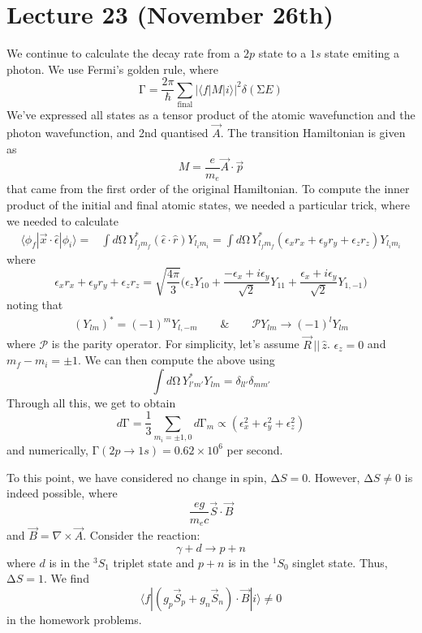 \section{Lecture 23 (November 26th)}
\begin{thm}
We continue to calculate the decay rate from a $2p$ state to a $1s$ state emiting a photon. We use Fermi's golden rule, where
\[\mathrm{\Gamma} =\dfrac{2\pi }{\hbar }\sum_{\mathrm{final}} |\langle f|M|i\rangle |^2\delta (\mathrm{\Sigma} E)\]
We've expressed all states as a tensor product of the atomic wavefunction and the photon wavefunction, and 2nd quantised $\vec{A}$. The transition Hamiltonian is given as
\[M=\dfrac{e}{m_{e}}\vec{A}\cdot \vec{p}\]
that came from the first order of the original Hamiltonian. To compute the inner product of the initial and final atomic states, we needed a particular trick, where we needed to calculate
\[\begin{align*}
\langle \phi _{f}|\vec{x}\cdot \hat{\epsilon }|\phi _{i}\rangle =&\int d\mathrm{\Omega} \,Y^{*}_{l_{f}m_{f}}(\hat{\epsilon }\cdot \hat{r})Y_{l_{i}m_{i}}=\int d\mathrm{\Omega} \,Y^{*}_{l_{f}m_{f}}(\epsilon_{x}r_{x}+\epsilon _{y}r_{y}+\epsilon _{z}r_{z})Y_{l_{i}m_{i}}
\end{align*}\]
where
\[\epsilon_{x}r_{x}+\epsilon_{y}r_{y}+\epsilon _{z}r_{z}=\sqrt{\dfrac{4\pi }{3}}\Big(\epsilon_{z}Y_{10}+\dfrac{-\epsilon_{x}+i\epsilon_{y}}{\sqrt{2}}Y_{11}+\dfrac{\epsilon _{x}+i\epsilon _{y}}{\sqrt{2}}Y_{1,-1}\Big)\]
noting that
\[\begin{align*}
(Y_{lm})^{*}=(-1)^{m}Y_{l,-m}\qquad\&\qquad \mathcal{P}Y_{lm}\rightarrow (-1)^{l}Y_{lm}
\end{align*}\]
where $\mathcal{P}$ is the parity operator. For simplicity, let's assume $\vec{R}\,||\,\hat{z}$. $\epsilon _{z}=0$ and $m_{f}-m_{i}=\pm 1$. We can then compute the above using
\[\int d\mathrm{\Omega} \,Y^{*}_{l'm'}Y_{lm}=\delta _{ll'}\delta _{mm'}\]
Through all this, we get to obtain
\[d\mathrm{\Gamma} =\dfrac{1}{3}\sum _{m_{i}=\pm 1,0}d\mathrm{\Gamma} _{m} \propto (\epsilon_{x}^2+\epsilon _{y}^2+\epsilon_{z}^2)\]
and numerically, $\mathrm{\Gamma} (2p\rightarrow 1s)=0.62\times 10^{6}$ per second. 
\end{thm}
\vspace{2ex}
\begin{ex}
To this point, we have considered no change in spin, $\mathrm{\Delta }S=0$. However, $\mathrm{\Delta }S\ne 0$ is indeed possible, where 
\[\dfrac{eg}{m_{e}c}\vec{S}\cdot \vec{B}\]
and $\vec{B}=\nabla \times \vec{A}$. Consider the reaction:
\[\gamma +d\rightarrow p+n\]
where $d$ is in the ${}^{3}S_{1}$ triplet state and $p+n$ is in the ${}^{1}S_{0}$ singlet state. Thus, $\mathrm{\Delta }S=1$. We find
\[\langle f|(g_{p}\vec{S}_{p}+g_{n}\vec{S}_{n})\cdot \vec{B}|i\rangle \ne 0\]
in the homework problems.
\end{ex}
